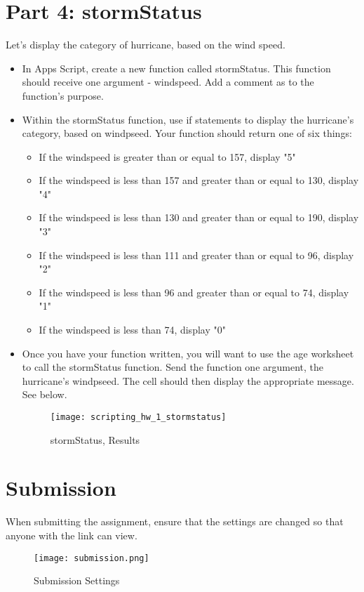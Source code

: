 \documentclass{article}
\begin{document}
\section*{Part 4: stormStatus}
Let's display the category of hurricane, based on the wind speed.
\begin{itemize}
	\item In Apps Script, create a new function called stormStatus.  This function should receive one argument - windspeed.  Add a comment as to the function's purpose.
	\item Within the stormStatus function, use if statements to display the hurricane's category, based on windpseed.  Your function should return one of six things:
	\begin{itemize}
		\item If the windspeed is greater than or equal to 157, display "5"
		\item If the windspeed is less than 157 and greater than or equal to 130, display "4"
		\item If the windspeed is less than 130 and greater than or equal to 190, display "3"
		\item If the windspeed is less than 111 and greater than or equal to 96, display "2"
		\item If the windspeed is less than 96 and greater than or equal to 74, display "1"
		\item If the windspeed is less than 74, display "0"
	\end{itemize}
	\item Once you have your function written, you will want to use the age worksheet to call the stormStatus function.  Send the function one argument, the hurricane's windpseed.  The cell should then display the appropriate message.  See below.
	\begin{figure}[H]
  \centering
  \texttt{[image: scripting\_hw\_1\_stormstatus]}
  \caption{stormStatus, Results}
\end{figure}
\end{itemize} 


\section*{Submission}
When submitting the assignment, ensure that the settings are changed so that anyone with the link can view.
\begin{figure}[H]
  \centering
  \texttt{[image: submission.png]}
  \caption{Submission Settings}
\end{figure}
\end{document}
